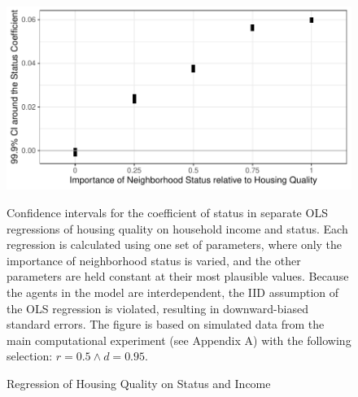 \documentclass[a4paper,12pt]{article}
\begin{document}
\begin{figure}
\caption{Regression of Housing Quality on Status and Income}
\includegraphics[width=\textwidth]{./images/abm_04_statusreg}

\tiny{Confidence intervals for the coefficient of status in separate OLS regressions of housing quality on household income and status. Each regression is calculated using one set of parameters, where only the importance of neighborhood status is varied, and the other parameters are held constant at their most plausible values. Because the agents in the model are interdependent, the IID assumption of the OLS regression is violated, resulting in downward-biased standard errors. The figure is based on simulated data from the main computational experiment (see Appendix A) with the following selection: $r = 0.5 \land d = 0.95$.}
\label{fig:reg}
\end{figure}
\end{document}
